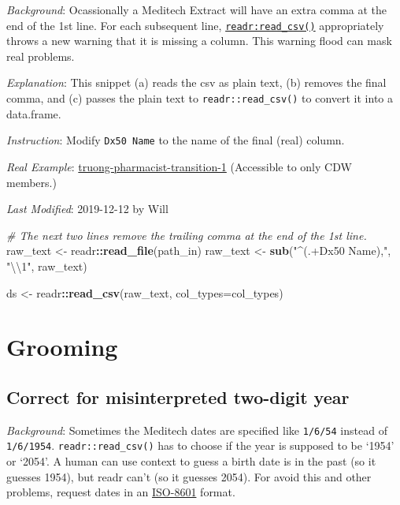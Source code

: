 \documentclass[
]{book}
\newenvironment{Shaded}{\begin{snugshade}}{\end{snugshade}}
\newcommand{\CharTok}[1]{\textcolor[rgb]{0.31,0.60,0.02}{#1}}
\newcommand{\CommentTok}[1]{\textcolor[rgb]{0.56,0.35,0.01}{\textit{#1}}}
\newcommand{\DataTypeTok}[1]{\textcolor[rgb]{0.13,0.29,0.53}{#1}}
\newcommand{\KeywordTok}[1]{\textcolor[rgb]{0.13,0.29,0.53}{\textbf{#1}}}
\newcommand{\NormalTok}[1]{#1}
\newcommand{\OperatorTok}[1]{\textcolor[rgb]{0.81,0.36,0.00}{\textbf{#1}}}
\newcommand{\StringTok}[1]{\textcolor[rgb]{0.31,0.60,0.02}{#1}}
\begin{document}
\emph{Background}: Ocassionally a Meditech Extract will have an extra comma at the end of the 1st line. For each subsequent line, \href{https://readr.tidyverse.org/reference/read_delim.html}{\texttt{readr:read\_csv()}} appropriately throws a new warning that it is missing a column. This warning flood can mask real problems.

\emph{Explanation}: This snippet (a) reads the csv as plain text, (b) removes the final comma, and (c) passes the plain text to \texttt{readr::read\_csv()} to convert it into a data.frame.

\emph{Instruction}: Modify \texttt{Dx50\ Name} to the name of the final (real) column.

\emph{Real Example}: \href{https://github.com/OuhscBbmc/truong-pharmacist-transition-1/blob/eec6d7eb8aaa9e3df52dafb826dbc53aaf515c63/manipulation/ellis/dx-ellis.R\#L158-L162}{truong-pharmacist-transition-1} (Accessible to only CDW members.)

\emph{Last Modified}: 2019-12-12 by Will

\begin{Shaded}
\begin{Highlighting}[]
\CommentTok{\# The next two lines remove the trailing comma at the end of the 1st line.}
\NormalTok{raw\_text  <{-}}\StringTok{ }\NormalTok{readr}\OperatorTok{::}\KeywordTok{read\_file}\NormalTok{(path\_in)}
\NormalTok{raw\_text  <{-}}\StringTok{ }\KeywordTok{sub}\NormalTok{(}\StringTok{"\^{}(.+Dx50 Name),"}\NormalTok{, }\StringTok{"}\CharTok{\textbackslash{}\textbackslash{}}\StringTok{1"}\NormalTok{, raw\_text)}

\NormalTok{ds        <{-}}\StringTok{ }\NormalTok{readr}\OperatorTok{::}\KeywordTok{read\_csv}\NormalTok{(raw\_text, }\DataTypeTok{col\_types=}\NormalTok{col\_types)}
\end{Highlighting}
\end{Shaded}

\hypertarget{snippets-grooming}{%
\section{Grooming}\label{snippets-grooming}}

\hypertarget{snippets-grooming-two-year}{%
\subsection{Correct for misinterpreted two-digit year}\label{snippets-grooming-two-year}}

\emph{Background}: Sometimes the Meditech dates are specified like \texttt{1/6/54} instead of \texttt{1/6/1954}. \texttt{readr::read\_csv()} has to choose if the year is supposed to be `1954' or `2054'. A human can use context to guess a birth date is in the past (so it guesses 1954), but readr can't (so it guesses 2054). For avoid this and other problems, request dates in an \href{https://www.explainxkcd.com/wiki/index.php/1179:_ISO_8601}{ISO-8601} format.
\end{document}
